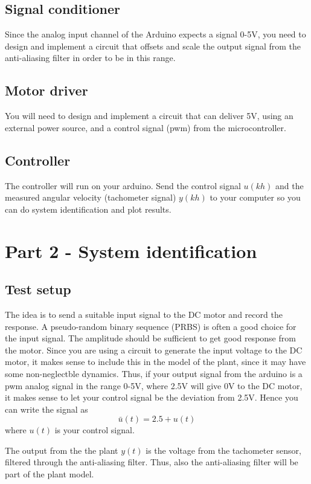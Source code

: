 \documentclass[a4paper]{scrartcl}
\begin{document}
\subsection*{Signal conditioner}
\label{sec-3-2}
Since the analog input channel of the Arduino expects a signal 0-5V, you need to design and implement a circuit that offsets and scale the output signal from the anti-aliasing filter in order to be in this range.

\subsection*{Motor driver}
\label{sec-3-3}
You will need to design and implement a circuit that can deliver \textpm{} 5V, using an external power source, and a control signal (pwm) from the microcontroller.
\subsection*{Controller}
\label{sec-3-4}
The controller will run on your arduino. Send the control signal \(u(kh)\) and the measured angular velocity (tachometer signal) \(y(kh)\) to your computer so you can do system identification and plot results. 

\section*{Part 2 - System identification}
\label{sec-4}

\subsection*{Test setup}
\label{sec-4-1}
The idea is to send a suitable input signal to the DC motor and record the response. A pseudo-random binary sequence (PRBS) is often a good choice for the input signal. The amplitude should be sufficient to get good response from the motor. Since you are using a circuit to generate the input voltage to the DC motor, it makes sense to include this in the model of the plant, since it may have some non-neglectble dynamics. Thus, if your output signal from the arduino is a pwm analog signal in the range 0-5V, where 2.5V will give 0V to the DC motor, it makes sense to let your control signal be the deviation from 2.5V. Hence you can write the signal as 
\[ \bar{u}(t) = 2.5 + u(t) \]
where \(u(t)\) is your control signal.

The output from the the plant \(y(t)\) is the voltage from the tachometer sensor, filtered through the anti-aliasing filter. Thus, also the anti-aliasing filter will be part of the plant model. 
\end{document}
